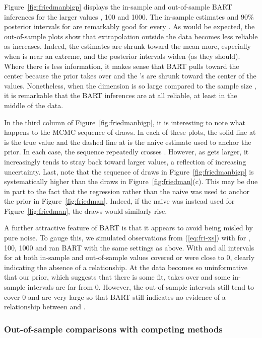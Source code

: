 \documentclass[aoas,nameyear,dvips]{arximspdf}
\begin{document}
Figure~\ref{fig:friedmanbigp} displays the in-sample and
out-of-sample BART inferences for the larger values , 100
and 1000. The in-sample estimates and 90\% posterior intervals for
 are remarkably good for every .  As would be expected,
the out-of-sample plots show that extrapolation outside the data
becomes less reliable as  increases.  Indeed, the estimates
are shrunk toward the mean more, especially when  is near an extreme, and the
posterior intervals widen (as they should). Where there is less
information, it makes sense that BART pulls toward the center
because the prior takes over and the 's are shrunk toward
the center of the  values.  Nonetheless, when the dimension
 is so large compared to the sample size , it is
remarkable that the BART inferences are at all reliable,
at least in the middle of the data.

In the third column of Figure~\ref{fig:friedmanbigp}, it is
interesting to note what happens to the MCMC sequence of 
draws. In each of these plots, the solid line at  is
the true value and the dashed line at  is the
naive estimate used to anchor the prior.  In each case, the
 sequence repeatedly crosses . However, as 
gets larger, it increasingly tends to stray back toward larger
values, a reflection of increasing uncertainty. Last, note that
the sequence of  draws in Figure~\ref{fig:friedmanbigp}
is systematically higher than the  draws in
Figure~\ref{fig:friedman}(c). This may be due in part to the fact that
the regression  rather than the naive  was
used to anchor the prior in Figure~\ref{fig:friedman}. Indeed, if
the naive  was instead used for
Figure~\ref{fig:friedman}, the  draws would similarly
rise.

A further attractive feature of BART is that it appears to avoid
being misled by pure noise.  To gauge this, we simulated 
observations from (\ref{eq:fri-xs}) with  for
, 100, 1000 and ran BART with the same settings as above. With
 and  all intervals for  at both in-sample and
out-of-sample  values covered or were close to 0, clearly
indicating the absence of a relationship. At  the data
becomes so uninformative that our prior, which suggests that there
is some fit, takes over and some in-sample intervals are far from
0. However, the out-of-sample intervals still tend to cover 0 and
are very large so that BART still indicates  no evidence of a
relationship between  and .

\subsubsection{Out-of-sample comparisons with competing methods}\label{sec:friedman-train-test}
\end{document}
